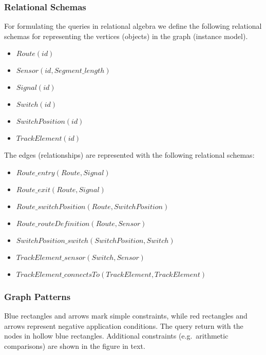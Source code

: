 \subsubsection{Relational Schemas}

For formulating the queries in relational algebra we define the following relational schemas for representing the vertices (objects) in the graph (instance model).

\begin{itemize}
  \item $ \mathit{Route}\left(\mathit{id}\right) $
  \item $ \mathit{Sensor}\left(\mathit{id}, \mathit{Segment\_length}\right) $
  \item $ \mathit{Signal}\left(\mathit{id}\right) $
  \item $ \mathit{Switch}\left(\mathit{id}\right) $
  \item $ \mathit{SwitchPosition}\left(\mathit{id}\right) $
  \item $ \mathit{TrackElement}\left(\mathit{id}\right) $
\end{itemize}

The edges (relationships) are represented with the following relational schemas:

\begin{itemize}
  \item $ \mathit{Route\_entry}\left(\mathit{Route}, \mathit{Signal}\right) $
  \item $ \mathit{Route\_exit}\left(\mathit{Route}, \mathit{Signal}\right) $
  \item $ \mathit{Route\_switchPosition}\left(\mathit{Route}, \mathit{SwitchPosition}\right) $
  \item $ \mathit{Route\_routeDefinition}\left(\mathit{Route}, \mathit{Sensor}\right) $
  \item $ \mathit{SwitchPosition\_switch}\left(\mathit{SwitchPosition}, \mathit{Switch}\right) $
  \item $ \mathit{TrackElement\_sensor}\left(\mathit{Switch}, \mathit{Sensor}\right) $
  \item $ \mathit{TrackElement\_connectsTo}\left(\mathit{TrackElement}, \mathit{TrackElement}\right) $
\end{itemize}

\subsubsection{Graph Patterns}

Blue rectangles and arrows mark simple constraints, while red rectangles and arrows represent negative application conditions. The query return with the nodes in hollow blue rectangles. Additional constraints (e.g.\ arithmetic comparisons) are shown in the figure in text.


